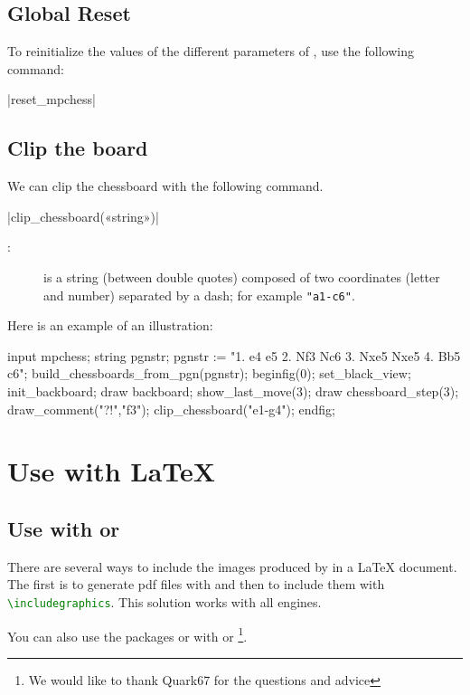 \documentclass[english]{ltxdoc}
\begin{document}
\subsection{Global Reset}

To reinitialize the values of the different parameters of \mpchess, use
the following command:

\commande|reset_mpchess|\smallskip


\subsection{Clip the board}

We can clip the chessboard with the following command.

\commande|clip_chessboard(«string»)|\smallskip


\begin{description}
\item[:] is a string (between double quotes)
composed of two coordinates (letter and number) separated by a dash; for example \lstinline+"a1-c6"+.
\end{description}

Here is an example of an illustration:
\begin{ExempleMP}
input mpchess;
string pgnstr;
pgnstr := "1. e4 e5 2. Nf3 Nc6 3. Nxe5 Nxe5 4. Bb5 c6";
build_chessboards_from_pgn(pgnstr);
beginfig(0);
set_black_view;
init_backboard;
draw backboard;
show_last_move(3);
draw chessboard_step(3); %
draw_comment("?!","f3");
clip_chessboard("e1-g4");
endfig;
\end{ExempleMP}


\section{Use with \LaTeX{}}

\subsection{Use with  or }

There are several ways to include the images produced by \mpchess in a \LaTeX
document. The first is to generate pdf files with \MP{} and then to include them
with \lstinline[language=TeX]+\includegraphics+. This solution works with all
engines.

You can also use the packages  or  with
 or \footnote{We would like to thank Quark67
for the questions and advice}.
\end{document}
